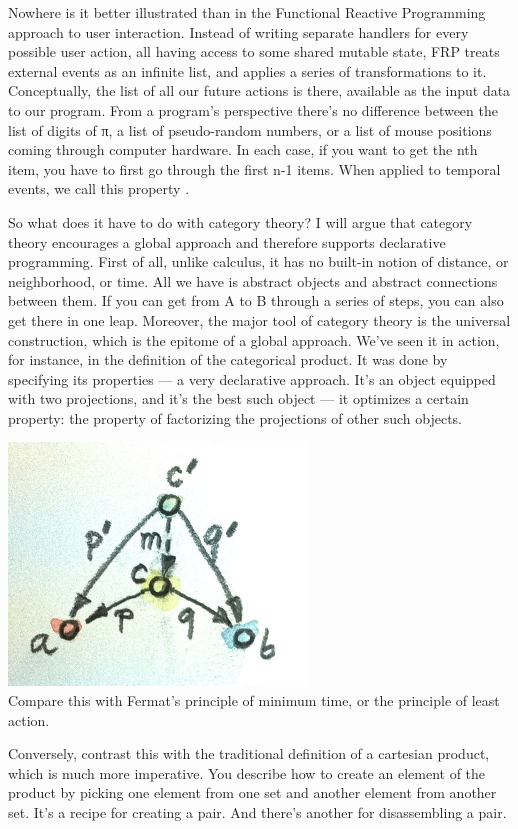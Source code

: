 Nowhere is it better illustrated than in the Functional Reactive
Programming approach to user interaction. Instead of writing separate
handlers for every possible user action, all having access to some
shared mutable state, FRP treats external events as an infinite list,
and applies a series of transformations to it. Conceptually, the list of
all our future actions is there, available as the input data to our
program. From a program's perspective there's no difference between the
list of digits of π, a list of pseudo-random numbers, or a list of mouse
positions coming through computer hardware. In each case, if you want to
get the nth item, you have to first go through the first n-1 items. When
applied to temporal events, we call this property .

So what does it have to do with category theory? I will argue that
category theory encourages a global approach and therefore supports
declarative programming. First of all, unlike calculus, it has no
built-in notion of distance, or neighborhood, or time. All we have is
abstract objects and abstract connections between them. If you can get
from A to B through a series of steps, you can also get there in one
leap. Moreover, the major tool of category theory is the universal
construction, which is the epitome of a global approach. We've seen it
in action, for instance, in the definition of the categorical product.
It was done by specifying its properties --- a very declarative
approach. It's an object equipped with two projections, and it's the
best such object --- it optimizes a certain property: the property of
factorizing the projections of other such objects.

\includegraphics[width=3.12500in]{images/productranking.jpg}\\
Compare this with Fermat's principle of minimum time, or the principle
of least action.

Conversely, contrast this with the traditional definition of a cartesian
product, which is much more imperative. You describe how to create an
element of the product by picking one element from one set and another
element from another set. It's a recipe for creating a pair. And there's
another for disassembling a pair.

